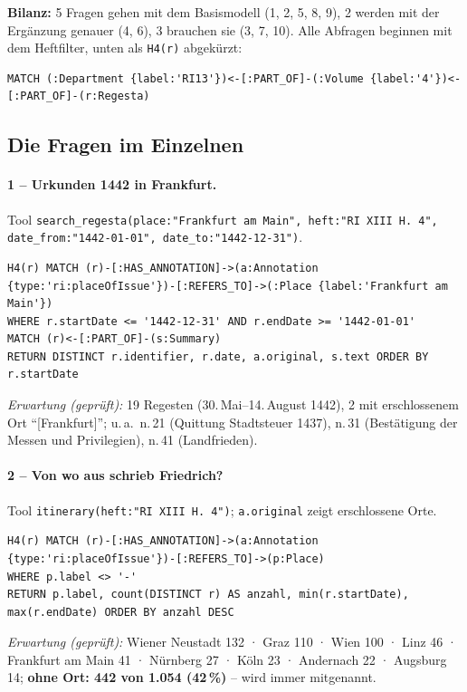 \documentclass[10pt,a4paper]{article}
\newcommand{\code}[1]{\texttt{\small #1}}
\begin{document}
\medskip
\noindent\textbf{Bilanz:} 5 Fragen gehen mit dem Basismodell (1, 2, 5, 8, 9), 2 werden mit der Ergänzung genauer (4, 6), 3 brauchen sie (3, 7, 10).
Alle Abfragen beginnen mit dem Heftfilter, unten als \code{H4(r)} abgekürzt:
\begin{lstlisting}
MATCH (:Department {label:'RI13'})<-[:PART_OF]-(:Volume {label:'4'})<-[:PART_OF]-(r:Regesta)
\end{lstlisting}

\subsection*{Die Fragen im Einzelnen}

\paragraph{1 -- Urkunden 1442 in Frankfurt.}
Tool \code{search\_regesta(place:"Frankfurt am Main", heft:"RI XIII H. 4", date\_from:"1442-01-01", date\_to:"1442-12-31")}.
\begin{lstlisting}
H4(r) MATCH (r)-[:HAS_ANNOTATION]->(a:Annotation {type:'ri:placeOfIssue'})-[:REFERS_TO]->(:Place {label:'Frankfurt am Main'})
WHERE r.startDate <= '1442-12-31' AND r.endDate >= '1442-01-01'
MATCH (r)<-[:PART_OF]-(s:Summary)
RETURN DISTINCT r.identifier, r.date, a.original, s.text ORDER BY r.startDate
\end{lstlisting}
\emph{Erwartung (geprüft):} 19 Regesten (30.\,Mai--14.\,August 1442), 2 mit erschlossenem Ort \enquote{[Frankfurt]}; u.\,a.\ n.\,21 (Quittung Stadtsteuer 1437), n.\,31 (Bestätigung der Messen und Privilegien), n.\,41 (Landfrieden).

\paragraph{2 -- Von wo aus schrieb Friedrich?}
Tool \code{itinerary(heft:"RI XIII H. 4")}; \code{a.original} zeigt erschlossene Orte.
\begin{lstlisting}
H4(r) MATCH (r)-[:HAS_ANNOTATION]->(a:Annotation {type:'ri:placeOfIssue'})-[:REFERS_TO]->(p:Place)
WHERE p.label <> '-'
RETURN p.label, count(DISTINCT r) AS anzahl, min(r.startDate), max(r.endDate) ORDER BY anzahl DESC
\end{lstlisting}
\emph{Erwartung (geprüft):} Wiener Neustadt 132 · Graz 110 · Wien 100 · Linz 46 · Frankfurt am Main 41 · Nürnberg 27 · Köln 23 · Andernach 22 · Augsburg 14; \textbf{ohne Ort: 442 von 1.054 (42\,\%)} -- wird immer mitgenannt.
\end{document}
